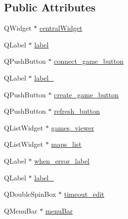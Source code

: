 \subsection*{Public Attributes}
\begin{DoxyCompactItemize}
\item 
Q\-Widget $\ast$ \hyperlink{classUi__game__setup_a4dfcb4d3bf0a2f29f9bc8354c9687dfd}{central\-Widget}
\item 
Q\-Label $\ast$ \hyperlink{classUi__game__setup_af247cb7103f2893112b515a475f88ae1}{label}
\item 
Q\-Push\-Button $\ast$ \hyperlink{classUi__game__setup_a91b386cf441741790b6e05490fda2559}{connect\-\_\-game\-\_\-button}
\item 
Q\-Label $\ast$ \hyperlink{classUi__game__setup_abb56f61c24a4993abeef283af64ab411}{label\-\_}
\item 
Q\-Push\-Button $\ast$ \hyperlink{classUi__game__setup_a272a6d3379864cedacdcb5f39cce438b}{create\-\_\-game\-\_\-button}
\item 
Q\-Push\-Button $\ast$ \hyperlink{classUi__game__setup_a1982cdaf064bb3a8f784254050159973}{refresh\-\_\-button}
\item 
Q\-List\-Widget $\ast$ \hyperlink{classUi__game__setup_a5f16472eaa18f7bd1aa1ce30d5362a1c}{games\-\_\-viewer}
\item 
Q\-List\-Widget $\ast$ \hyperlink{classUi__game__setup_a5a0c74d0c52179ccaa7703770cece094}{maps\-\_\-list}
\item 
Q\-Label $\ast$ \hyperlink{classUi__game__setup_af02f3182e60b85fbd75f65937fe46c91}{when\-\_\-error\-\_\-label}
\item 
Q\-Label $\ast$ \hyperlink{classUi__game__setup_a0d0d4dce33543ffae0b76c7d7e1b9b51}{label\-\_}
\item 
Q\-Double\-Spin\-Box $\ast$ \hyperlink{classUi__game__setup_a40da11a9746d8882462ed1f493c193b2}{timeout\-\_\-edit}
\item 
Q\-Menu\-Bar $\ast$ \hyperlink{classUi__game__setup_a9a7e53627ea76bb9080ec7b26c160a12}{menu\-Bar}
\end{DoxyCompactItemize}


